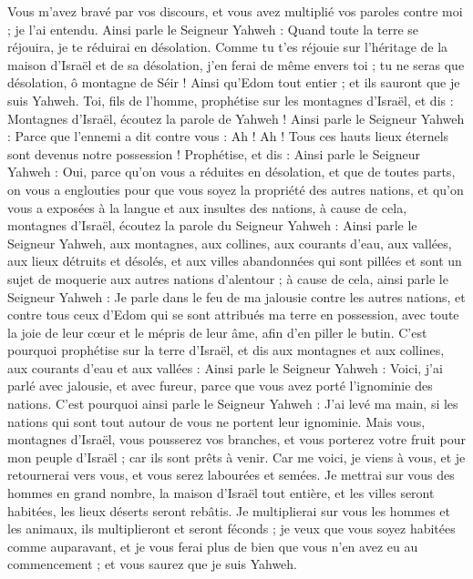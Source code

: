 \begin{multicols}{2}
Vous m'avez bravé par vos discours, et vous avez multiplié vos paroles contre moi ; je l'ai entendu.
Ainsi parle le Seigneur Yahweh : Quand toute la terre se réjouira, je te réduirai en désolation.
Comme tu t'es réjouie sur l'héritage de la maison d'Israël et de sa désolation,  j'en ferai de même envers toi ; tu ne seras que désolation, ô montagne de Séir ! Ainsi qu’Edom tout entier ; et ils sauront que je suis Yahweh.
\VerseOne{}Toi, fils de l’homme, prophétise sur les montagnes d'Israël, et dis : Montagnes d'Israël, écoutez la parole de Yahweh !
Ainsi parle le Seigneur Yahweh : Parce que l'ennemi a dit contre vous : Ah ! Ah ! Tous ces hauts lieux éternels sont devenus notre possession !
Prophétise, et dis : Ainsi parle le Seigneur Yahweh : Oui, parce qu'on vous a réduites en désolation, et que de toutes parts, on vous a englouties pour que vous soyez la propriété des autres nations, et qu'on vous a exposées à la langue et aux insultes des nations,
à cause de cela, montagnes d'Israël, écoutez la parole du Seigneur Yahweh : Ainsi parle le Seigneur Yahweh, aux montagnes, aux collines, aux courants d'eau, aux vallées, aux lieux détruits et désolés, et aux villes abandonnées qui sont pillées et sont un sujet de moquerie aux autres nations d’alentour ;
à cause de cela, ainsi parle le Seigneur Yahweh : Je parle dans le feu de ma jalousie contre les autres nations, et contre tous ceux d'Edom qui se sont attribués ma terre en possession, avec toute la joie de leur cœur et le mépris de leur âme, afin d’en piller le butin.
C'est pourquoi prophétise sur la terre d'Israël, et dis aux montagnes et aux collines, aux courants d'eau et aux vallées : Ainsi parle le Seigneur Yahweh : Voici, j'ai parlé avec jalousie, et avec fureur, parce que vous avez porté l'ignominie des nations.
C'est pourquoi ainsi parle le Seigneur Yahweh : J'ai levé ma main, si les nations qui sont tout autour de vous ne portent leur ignominie.
Mais vous, montagnes d'Israël, vous pousserez vos branches, et vous porterez votre fruit pour mon peuple d'Israël ; car ils sont prêts à venir.
Car me voici, je viens à vous, et je retournerai vers vous, et vous serez labourées et semées.
Je mettrai sur vous des hommes en grand nombre, la maison d'Israël tout entière, et les villes seront habitées, les lieux déserts seront rebâtis.
Je multiplierai sur vous les hommes et les animaux, ils multiplieront et seront féconds ; je veux que vous soyez habitées comme auparavant, et je vous ferai plus de bien que vous n'en avez eu au commencement ; et vous saurez que je suis Yahweh.

\end{multicols}
